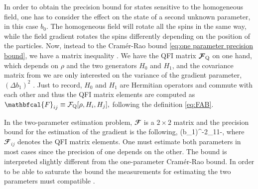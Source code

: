 In order to obtain the precision bound for states sensitive to the
homogeneous field, one has to consider the effect on the state of a second
unknown parameter, in this case $b_0$.
The homogeneous field will rotate all the spins in the same way,
while the field gradient rotates the spins
differently depending on the position of the particles.
Now, instead to the Cram\'er-Rao bound  \eqref{eq:one parameter precision bound},
we have a matrix inequality \cite{Paris2009}.
We have the QFI matrix $\boldsymbol{\mathcal{F}}_{\text{Q}}$ on one hand, which depends on $\rho$ and the two generators $H_0$ and $H_1$, and the covariance matrix from we are only interested on the variance of the gradient parameter, $(\Delta b_1)^2$ \cite{Paris2009}.
Just to record, $H_0$ and $H_1$ are Hermitian operators and commute with each other and thus the QFI matrix elements are computed as $\mathbfcal{F}_{ij}\equiv \qfif{\rho, H_i, H_j},$ following the definition \eqref{eq:FAB}.

In the two-parameter estimation problem, ${\mathbfcal{F}}$ is a $2 \times 2$ matrix and the precision bound for the estimation of the gradient is the following,
\be
\label{eq:precision bound for b1 in terms of QFI matrix elements}
(\Delta b_1)^{-2}\leqslant {}_{11}-,
\ee
where $\mathbfcal{F}_{ij}$ denotes the QFI matrix elements.
One must estimate both parameters in most cases since the precision of one depends on the other.
The bound is interpreted slightly different from the one-parameter Cram\'er-Rao bound.
In order to be able to saturate the bound the measurements for estimating the two parameters must compatible \cite{Paris2009}.


